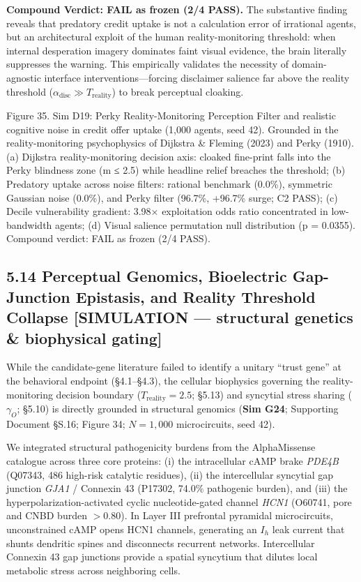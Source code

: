 \documentclass[
]{article}
\begin{document}
\textbf{Compound Verdict: FAIL as frozen (2/4 PASS).} The substantive
finding reveals that predatory credit uptake is not a calculation error
of irrational agents, but an architectural exploit of the human
reality-monitoring threshold: when internal desperation imagery
dominates faint visual evidence, the brain literally suppresses the
warning. This empirically validates the necessity of domain-agnostic
interface interventions---forcing disclaimer salience far above the
reality threshold (\(\alpha_{\text{disc}} \gg T_{\text{reality}}\)) to
break perceptual cloaking.

Figure 35. Sim D19: Perky Reality-Monitoring Perception Filter and
realistic cognitive noise in credit offer uptake (1,000 agents, seed
42). Grounded in the reality-monitoring psychophysics of Dijkstra \&
Fleming (2023) and Perky (1910). (a) Dijkstra reality-monitoring
decision axis: cloaked fine-print falls into the Perky blindness zone
({m ≤ 2.5}) while headline relief breaches the threshold; (b) Predatory
uptake across noise filters: rational benchmark (0.0\%), symmetric
Gaussian noise (0.0\%), and Perky filter (96.7\%, +96.7\% surge; C2
PASS); (c) Decile vulnerability gradient: {3.98×} exploitation odds
ratio concentrated in low-bandwidth agents; (d) Visual salience
permutation null distribution ({p = 0.0355}). Compound verdict: FAIL as
frozen (2/4 PASS).

\subsection{5.14 Perceptual Genomics, Bioelectric Gap-Junction
Epistasis, and Reality Threshold Collapse {[}SIMULATION --- structural
genetics \& biophysical
gating{]}}\label{perceptual-genomics-bioelectric-gap-junction-epistasis-and-reality-threshold-collapse-simulation-structural-genetics-biophysical-gating}

While the candidate-gene literature failed to identify a unitary ``trust
gene'' at the behavioral endpoint (§4.1--§4.3), the cellular biophysics
governing the reality-monitoring decision boundary
(\(T_{\text{reality}} = 2.5\); §5.13) and syncytial stress sharing
(\(\gamma_O\); §5.10) is directly grounded in structural genomics
(\textbf{Sim G24}; Supporting Document §S.16; Figure 34; \(N = 1,000\)
microcircuits, seed 42).

We integrated structural pathogenicity burdens from the AlphaMissense
catalogue across three core proteins: (i) the intracellular cAMP brake
\emph{PDE4B} (Q07343, 486 high-risk catalytic residues), (ii) the
intercellular syncytial gap junction \emph{GJA1} / Connexin 43 (P17302,
74.0\% pathogenic burden), and (iii) the hyperpolarization-activated
cyclic nucleotide-gated channel \emph{HCN1} (O60741, pore and CNBD
burden \(>0.80\)). In Layer III prefrontal pyramidal microcircuits,
unconstrained cAMP opens HCN1 channels, generating an \(I_h\) leak
current that shunts dendritic spines and disconnects recurrent networks.
Intercellular Connexin 43 gap junctions provide a spatial syncytium that
dilutes local metabolic stress across neighboring cells.
\end{document}
